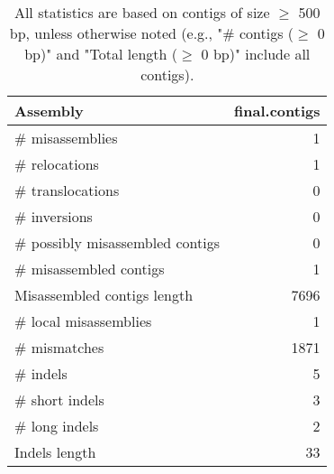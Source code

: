 \documentclass[12pt,a4paper]{article}
\begin{document}
\begin{table}[ht]
\begin{center}
\caption{All statistics are based on contigs of size $\geq$ 500 bp, unless otherwise noted (e.g., "\# contigs ($\geq$ 0 bp)" and "Total length ($\geq$ 0 bp)" include all contigs).}
\begin{tabular}{|l*{1}{|r}|}
\hline
Assembly & final.contigs \\ \hline
\# misassemblies & 1 \\ \hline
\hspace{5mm}\# relocations & 1 \\ \hline
\hspace{5mm}\# translocations & 0 \\ \hline
\hspace{5mm}\# inversions & 0 \\ \hline
\# possibly misassembled contigs & 0 \\ \hline
\# misassembled contigs & 1 \\ \hline
Misassembled contigs length & 7696 \\ \hline
\# local misassemblies & 1 \\ \hline
\# mismatches & 1871 \\ \hline
\# indels & 5 \\ \hline
\hspace{5mm}\# short indels & 3 \\ \hline
\hspace{5mm}\# long indels & 2 \\ \hline
Indels length & 33 \\ \hline
\end{tabular}
\end{center}
\end{table}
\end{document}

